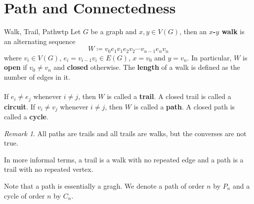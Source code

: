 \documentclass[math]{amznotes}
\theoremstyle{remark}
\newtheorem*{remark}{Remark}
\begin{document}
\section{Path and Connectedness}
\begin{dfnbox}{Walk, Trail, Path}{wtp}
    Let $G$ be a graph and $x, y \in V(G)$, then an {\color{red} \textbf{$x$-$y$ walk}} is an alternating sequence
    \begin{equation*}
        W \coloneqq v_0e_1v_1e_2v_2\cdots v_{n - 1}e_nv_n
    \end{equation*}
    where $v_i \in V(G)$, $e_i = v_{i - 1}v_i \in E(G)$, $x = v_0$ and $y = v_n$. In particular, $W$ is {\color{red} \textbf{open}} if $v_0 \neq v_n$ and {\color{red} \textbf{closed}} otherwise. The {\color{red} \textbf{length}} of a walk is defined as the number of edges in it.
    \\\\
    If $e_i \neq e_j$ whenever $i \neq j$, then $W$ is called a {\color{red} \textbf{trail}}. A closed trail is called a {\color{red} \textbf{circuit}}. If $v_i \neq v_j$ whenever $i \neq j$, then $W$ is called a {\color{red} \textbf{path}}. A closed path is called a {\color{red} \textbf{cycle}}.
\end{dfnbox}
\begin{notebox}
    \begin{remark}
        All paths are trails and all trails are walks, but the converses are not true.
    \end{remark}
\end{notebox}
In more informal terms, a trail is a walk with no repeated edge and a path is a trail with no repeated vertex.

Note that a path is essentially a gragh. We denote a path of order $n$ by $P_n$ and a cycle of order $n$ by $C_n$.
\end{document}

